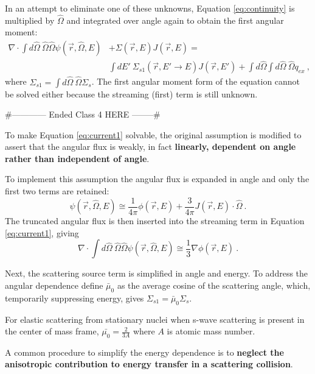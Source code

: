 \documentclass[12pt]{article}
\newlength{\up}
\newcommand{\Macro}{\ensuremath{\Sigma}}
\newcommand{\vOmega}{\ensuremath{\hat{\Omega}}}
\begin{document}
In an attempt to eliminate one of these unknowns, Equation \eqref{eq:continuity} is multiplied by $\hat{\Omega}$ and integrated over angle again to obtain the first angular moment:
%
\begin{align}
  \nabla \cdot \int  d\vOmega \:\vOmega \vOmega \psi(\vec{r}, \vOmega, E) &+ \Macro(\vec{r},E) J(\vec{r},E)= \nonumber \\
  &\int dE' \:\Macro_{s1}(\vec{r}, E' \to E)J(\vec{r},E') + \int d\vOmega \int d\vOmega \:\vOmega q_{ex} \:,
  \label{eq:current1}
\end{align}
%
where $\Macro_{s1}  = \int d\vOmega \:\vOmega \Macro_{s}$. The first angular moment form of the equation cannot be solved either because the streaming (first) term is still unknown. 

\#------------ Ended Class 4 HERE --------\#

To make Equation \eqref{eq:current1} solvable, the original assumption is modified to assert that the angular flux is weakly, in fact \textbf{linearly, dependent on angle rather than independent of angle}.

To implement this assumption the angular flux is expanded in angle and only the first two terms are retained:  
%
\begin{equation}
  \psi(\vec{r}, \vOmega, E) \cong \frac{1}{4 \pi} \phi(\vec{r}, E) + \frac{3}{4 \pi}J(\vec{r}, E) \cdot \vOmega \:.
  \label{eq:angExpand} 
\end{equation}
The truncated angular flux is then inserted into the streaming term in Equation \eqref{eq:current1}, giving 
%
\begin{equation}
  \nabla \cdot \int d \vOmega \:\vOmega \vOmega \psi(\vec{r}, \vOmega, E)  \cong \frac{1}{3} \nabla \phi(\vec{r}, E) \:. 
  \label{eq:firstTerm}
\end{equation}

Next, the scattering source term is simplified in angle and energy. To address the angular dependence define $\bar{\mu}_{0}$ as the average cosine of the scattering angle, which, temporarily suppressing energy, gives $\Macro_{s1} = \bar{\mu}_{0}\Macro_{s}$. 

For elastic scattering from stationary nuclei when s-wave scattering is present in the center of mass frame, $\bar{\mu_{0}} = \frac{2}{3A}$ where $A$ is atomic mass number. 

A common procedure to simplify the energy dependence is to \textbf{neglect the anisotropic contribution to energy transfer in a scattering collision}.
\end{document}
